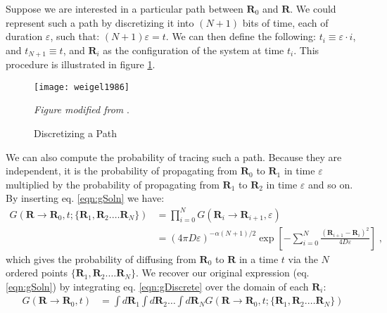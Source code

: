 \documentclass[letterpaper,12pt]{article}
\renewcommand{\vec}[1]{\mathbf{#1}}
\renewcommand{\refeq}[1]{eq. \ref{eqn:#1}}
\begin{document}
Suppose we are interested in  a particular path between $\vec{R}_0$ and $\vec{R}$. We could represent such a path by discretizing it into $(N+1)$ bits of time, each of duration $\varepsilon$, such that: $(N+1)\varepsilon=t$. We can then define the following: $ t_{i} \equiv \varepsilon \cdot i $, and  $t_{N+1} \equiv t$, and $\vec{R}_{i}$ as the configuration of the system at time $t_i$. This procedure is illustrated in figure \ref{fig:path}.

\begin{figure}[H]
\begin{center}
\texttt{[image: weigel1986]}
\caption{Discretizing a Path}{\label{fig:path}\emph{Figure modified from} \cite{wiegel:1986}.}
\end{center}
\end{figure}

We can also compute the probability of tracing such a path. Because they are independent,  it is the probability of propagating from $\vec{R}_0$ to $\vec{R}_1$ in time $\varepsilon$ multiplied by the probability of propagating from $\vec{R}_1$ to $\vec{R}_2$ in time $\varepsilon$ and so on. By inserting \refeq{gSoln} we have:
\begin{align} \label{eqn:gDiscrete}
G(\vec{R} \rightarrow \vec{R}_{0} , t ; \{\vec{R}_1, \vec{R}_2. \ldots \vec{R}_N\})  &= \prod_{i=0}^{N} G(\vec{R}_{i} \rightarrow \vec{R}_{i+1}, \varepsilon) \\
&=  (4\pi D \varepsilon)^{-\alpha(N+1)/2}\exp\left[ - \sum_{i=0}^{N} \frac{(\vec{R}_{i+1} - \vec{R}_i)^2}{4D\varepsilon}\right] \; ,
\end{align}
which gives the probability of diffusing from $\vec{R}_{0}$ to $\vec{R}$ in a time $t$ via the $N$ ordered points $\{\vec{R}_1, \vec{R}_2. \ldots \vec{R}_N\}$. We recover our original expression (\refeq{gSoln}) by integrating \refeq{gDiscrete} over the domain of each $\vec{R}_{i}$:
\begin{align}
G(\vec{R} \rightarrow \vec{R}_{0} , t) &= \int d\vec{R}_1 \int d\vec{R}_2 \ldots \int d\vec{R}_N  G(\vec{R} \rightarrow \vec{R}_{0} , t ; \{\vec{R}_1, \vec{R}_2. \ldots \vec{R}_N\}) 
\end{align}
\end{document}
